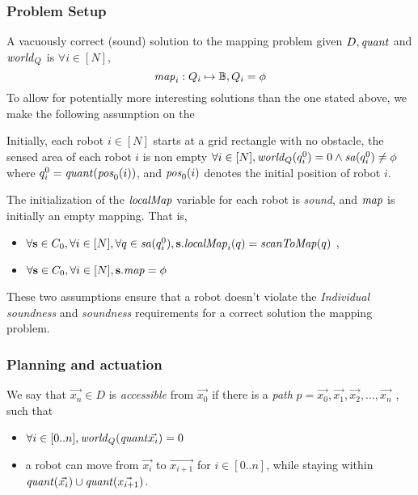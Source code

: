 \subsubsection{Problem Setup}

A vacuously correct (sound) solution to the mapping problem given $D, \mathit{quant}$ and $\mathit{world}_Q$ is $\forall i \in [N]$, $$\mathit{map}_i : Q_i \mapsto \mathbb{B}, Q_i = \phi$$ To allow for potentially more interesting solutions than the one stated above, we make the following assumption on the
\begin{assumption}
    \label{init}
Initially, each robot $i\in[N]$ starts at a grid rectangle with no obstacle, the sensed area of each robot $i$ is non empty
$\forall i \in [N], \mathit{world}_Q(q^0_i) = 0\wedge \mathit{sa}(q^0_i) \neq \phi$
where $q^0_i = \mathit{quant}(\mathit{pos}_0(i))$, and $\mathit{pos}_0(i)$ denotes the initial position of robot $i$.
\end{assumption}

\begin{assumption}
The initialization of the $\mathit{localMap}$ variable for each robot is \emph{sound}, and $\mathit{map}$ is initially an empty mapping. That is,

    \label{initval}
\begin{itemize}\item   $\forall {\textbf{s}} \in C_0, \forall i \in [N], \forall q \in \mathit{sa}(q^0_i), {\textbf{s}}.\mathit{localMap}_i(q) = \mathit{scanToMap}(q)$ ,
    \item $\forall {\textbf{s}} \in C_0, \forall i \in [N], {\textbf{s}}.\mathit{map} = \phi$
\end{itemize}
\end{assumption}

These two assumptions ensure that a robot doesn't violate the \emph{Individual soundness} and \emph{ soundness} requirements for a correct solution the mapping problem.

\subsubsection{Planning and actuation}

\begin{definition}
    We say that $\Vec{x_n}\in D$ is \emph{accessible} from $\Vec{x_0}$ if there is a \emph{path} $p = \Vec{x_0},\Vec{x_1}, \Vec{x_2},\ldots, \Vec{x_n}$ , such that
    \begin{itemize}
        \item $\forall i \in [0..n],\mathit{world}_Q(\mathit{quant}{\Vec{x_i}}) = 0$
        \item a robot can move from $\Vec{x_i}$ to $\Vec{x_{i+1}}$ for $i \in [0..n]$, while staying within $\mathit{quant}(\Vec{x_i}) \cup \mathit{quant}(\Vec{x_{i+1}})$.
    \end{itemize}
\end{definition}

